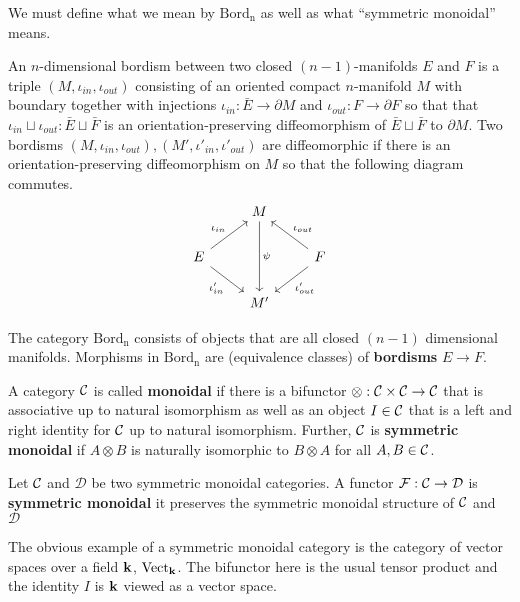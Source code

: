 	We must define what we mean by $\mathrm{Bord_n}$ as well as what ``symmetric monoidal'' means.
	\begin{defn}[Bordism]
		An $n$-dimensional bordism between two closed $(n-1)$-manifolds $E$ and $F$ is a triple $(M, \iota_{in},\iota_{out})$ consisting of an oriented compact $n$-manifold $M$ with boundary together with injections $\iota_{in}: \bar E \to \partial M$ and $\iota_{out}: F \to \partial F$ so that that $\iota_{in} \sqcup \iota_{out}: \bar E \sqcup \bar F$ is an orientation-preserving diffeomorphism of $\bar E \sqcup \bar F$ to $\partial M$. Two bordisms $(M, \iota_{in}, \iota_{out}), (M', \iota'_{in}, \iota'_{out})$ are diffeomorphic if there is an orientation-preserving diffeomorphism on $M$ so that the following diagram commutes.
		\[
			\begin{tikzcd}
				& M\arrow[dd,"\psi"] &\\
				E\arrow[ur,"\iota_{in}"]\arrow[dr,swap,"\iota'_{in}"] & & \arrow[ul,swap,"\iota_{out}"]\arrow[dl,"\iota'_{out}"] F\\
				& M' &
			\end{tikzcd}
		\]
	\end{defn}
	\begin{defn}
		The category $\mathrm{Bord_n}$ consists of objects that are all closed $(n-1)$ dimensional manifolds. Morphisms in $\mathrm{Bord_n}$ are (equivalence classes) of \textbf{bordisms} $E \to F$. 
	\end{defn}
	
	\begin{defn}
		A category $\mathcal{C}$ is called \textbf{monoidal} if there is a bifunctor $\otimes: \mathcal{C} \times \mathcal{C} \to \mathcal{C}$ that is associative up to natural isomorphism as well as an object $I \in \mathcal{C}$ that is a left and right identity for $\mathcal{C}$ up to natural isomorphism. Further, $\mathcal{C}$ is \textbf{symmetric monoidal} if $A \otimes B$ is naturally isomorphic to $B \otimes A$ for all $A, B \in \mathcal{C}$.
	\end{defn}
	
	\noindent Let $\mathcal{C}$ and $\mathcal D$ be two symmetric monoidal categories. A functor $\mathcal F: \mathcal{C} \to \mathcal D$ is \textbf{symmetric monoidal} it preserves the symmetric monoidal structure of $\mathcal{C}$ and $\mathcal D$ 
	
	\begin{eg}
		The obvious example of a symmetric monoidal category is the category of vector spaces over a field $\mathbf{k}$, $\mathrm{Vect}_{\mathbf{k}}$. The bifunctor here is the usual tensor product and the identity $I$ is $\mathbf{k}$ viewed as a vector space. 
	\end{eg}
	
